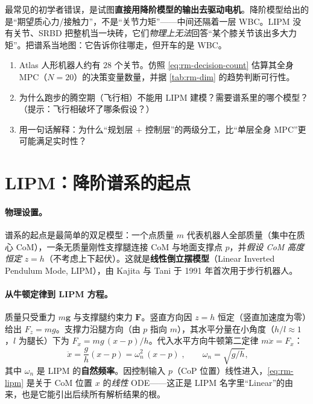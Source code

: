 \begin{pitfall}[简化模型只用于规划层]
最常见的初学者错误，是试图\textbf{直接用降阶模型的输出去驱动电机}。降阶模型给出的是“期望质心力/接触力”，不是“关节力矩”——中间还隔着一层 WBC。LIPM 没有关节、SRBD 把整机当一块砖，它们\emph{物理上无法}回答“某个膝关节该出多大力矩”。把谱系当地图：它告诉你往哪走，但开车的是 WBC。
\end{pitfall}

\begin{exercise}
\begin{enumerate}
  \item Atlas 人形机器人约有 $28$ 个关节。仿照 \cref{eq:rm-decision-count} 估算其全身 MPC（$N=20$）的决策变量数量，并据 \cref{tab:rm-dim} 的趋势判断可行性。
  \item 为什么跑步的腾空期（飞行相）不能用 LIPM 建模？需要谱系里的哪个模型？（提示：飞行相破坏了哪条假设？）
  \item 用一句话解释：为什么“规划层 $+$ 控制层”的两级分工，比“单层全身 MPC”更可能满足实时性？
\end{enumerate}
\end{exercise}

\section{LIPM：降阶谱系的起点}
\label{sec:rm-lipm}

\paragraph{物理设置。}
谱系的起点是最简单的双足模型：一个点质量 $m$ 代表机器人全部质量（集中在质心 $\mathrm{CoM}$），一条无质量刚性支撑腿连接 CoM 与地面支撑点 $p$，并\emph{假设 CoM 高度恒定} $z=h$（不考虑上下起伏）。这就是\textbf{线性倒立摆模型}（Linear Inverted Pendulum Mode, LIPM），由 Kajita 与 Tani 于 1991 年首次用于步行机器人\cite{kajita1991study}。

\paragraph{从牛顿定律到 LIPM 方程。}
质量只受重力 $m\mathbf{g}$ 与支撑腿约束力 $\mathbf{F}$。竖直方向因 $z=h$ 恒定（竖直加速度为零）给出 $F_z=mg$。支撑力沿腿方向（由 $p$ 指向 $m$），其水平分量在小角度（$h/l\approx 1$，$l$ 为腿长）下为 $F_x=mg\,(x-p)/h$。代入水平方向牛顿第二定律 $m\ddot{x}=F_x$：
\begin{equation}
  \boxed{\;\ddot{x}=\frac{g}{h}(x-p)=\omega_n^2\,(x-p)\;},\qquad \omega_n=\sqrt{g/h},
  \label{eq:rm-lipm}
\end{equation}
其中 $\omega_n$ 是 LIPM 的\textbf{自然频率}。因控制输入 $p$（CoP 位置）线性进入，\cref{eq:rm-lipm} 是关于 CoM 位置 $x$ 的\emph{线性} ODE——这正是 LIPM 名字里“Linear”的由来，也是它能引出后续所有解析结果的根。

